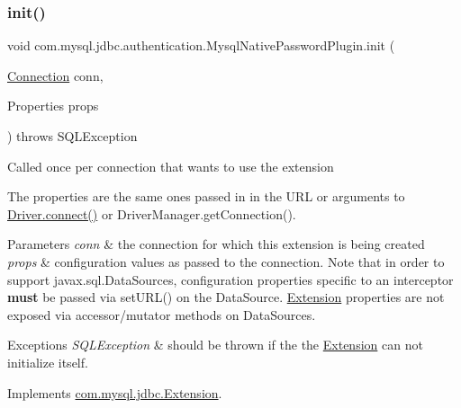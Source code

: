 \subsubsection{\texorpdfstring{init()}{init()}}
{\footnotesize\ttfamily void com.\+mysql.\+jdbc.\+authentication.\+Mysql\+Native\+Password\+Plugin.\+init (\begin{DoxyParamCaption}\item[{\mbox{\hyperlink{interfacecom_1_1mysql_1_1jdbc_1_1_connection}{Connection}}}]{conn,  }\item[{Properties}]{props }\end{DoxyParamCaption}) throws S\+Q\+L\+Exception}

Called once per connection that wants to use the extension

The properties are the same ones passed in in the U\+RL or arguments to \mbox{\hyperlink{classcom_1_1mysql_1_1jdbc_1_1_non_registering_driver_a834c012e752a01d1ee435b3461bb8218}{Driver.\+connect()}} or Driver\+Manager.\+get\+Connection().


\begin{DoxyParams}{Parameters}
{\em conn} & the connection for which this extension is being created \\
\hline
{\em props} & configuration values as passed to the connection. Note that in order to support javax.\+sql.\+Data\+Sources, configuration properties specific to an interceptor {\bfseries must} be passed via set\+U\+R\+L() on the Data\+Source. \mbox{\hyperlink{interfacecom_1_1mysql_1_1jdbc_1_1_extension}{Extension}} properties are not exposed via accessor/mutator methods on Data\+Sources.\\
\hline
\end{DoxyParams}

\begin{DoxyExceptions}{Exceptions}
{\em S\+Q\+L\+Exception} & should be thrown if the the \mbox{\hyperlink{interfacecom_1_1mysql_1_1jdbc_1_1_extension}{Extension}} can not initialize itself. \\
\hline
\end{DoxyExceptions}


Implements \mbox{\hyperlink{interfacecom_1_1mysql_1_1jdbc_1_1_extension_a79427811058193260bd4df0c38414e88}{com.\+mysql.\+jdbc.\+Extension}}.

\mbox{\label{classcom_1_1mysql_1_1jdbc_1_1authentication_1_1_mysql_native_password_plugin_aa11ae323c22a910cd0cd6a1e904ff458}} 
